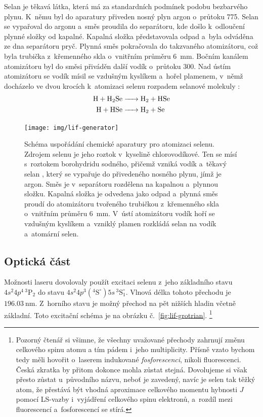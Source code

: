 Selan je těkavá látka, která má za standardních podmínek podobu
bezbarvého plynu.
K~němu byl do aparatury přiveden nosný plyn argon o~průtoku \SI{775}{\sccm}.
Selan se vypařoval do argonu a~směs proudila do separátoru,
kde došlo k~odloučení plynné složky od kapalné.
Kapalná složka představovala odpad a~byla odváděna ze dna separátoru pryč.
Plynná směs pokračovala do takzvaného atomizátoru,
což byla trubička z~křemenného skla o~vnitřním průměru \SI{6}{\milli\metre}.
Bočním kanálem atomizátoru byl do směsi přiváděn další vodík
o~průtoku \SI{300}{\sccm}.
Nad ústím atomizátoru se vodík mísil se vzdušným kyslíkem
a~hořel plamenem, v~němž docházelo ve dvou krocích
k~atomizaci selenu rozpadem selanové molekuly :
\begin{align*}
	\ce{
		H + H2Se &-> H2 + HSe \\
		H + HSe &-> H2 + Se
	}
\end{align*}

\begin{figure}[htbp]
	\centering
	\texttt{[image: img/lif-generator]}
	\caption{Schéma uspořádání chemické aparatury pro atomizaci selenu.
		Zdrojem selenu je jeho roztok v~kyselině chlorovodíkové.
		Ten se mísí s~roztokem borohydridu sodného,
		přičemž vzniká vodík a~těkavý selan ,
		který se vypařuje do přivedeného nosného plynu, jímž je argon.
		Směs je v~separátoru rozdělena na kapalnou a~plynnou složku.
		Kapalná složka je odvedena jako odpad a~plynná směs proudí
		do atomizátoru tvořeného trubičkou z~křemenného skla
		o~vnitřním průměru \SI{6}{\milli\metre}.
		V~ústí atomizátoru vodík hoří se vzdušným kyslíkem
		a~vzniklý plamen rozkládá selan na vodík a~atomární selen.}
	\label{fig:lif-generator}
\end{figure}

\subsection{Optická část}
\label{sec:lif-setup-optics}
Možnosti laseru dovolovaly použít excitaci selenu z~jeho základního stavu
$4s^2 4p^4\,{}^3\text{P}_2$
do stavu $4s^2 4p^3({}^4\text{S}^\circ) 5s\,{}^3\text{S}^\circ_1$.
Vlnová délka tohoto přechodu je $\SI{196.03}{\nano\metre}$.
Z~horního stavu je možný přechod na pět nižších hladin včetně základní.
Toto excitační schéma je na obrázku č.~\ref{fig:lif-grotrian}.%
\footnote{Pozorný čtenář si všimne, že všechny uvažované přechody
zahrnují změnu celkového spinu atomu a tím pádem i~jeho multiplicity.
Přísně vzato bychom tedy měli hovořit o~laserem indukované
\emph{fosforescenci}, nikoli fluorescenci.
Česká zkratka by přitom dokonce mohla zůstat stejná.
Dovolujeme si však přesto zůstat u~původního názvu, neboť je zavedený,
navíc je selen tak těžký atom, že přestává být vhodná aproximace celkového
momentu hybnosti $J$ pomocí LS-vazby i~vyjádření celkového spinu elektronů,
a~rozdíl mezi fluorescencí a~fosforescencí se stírá.}

